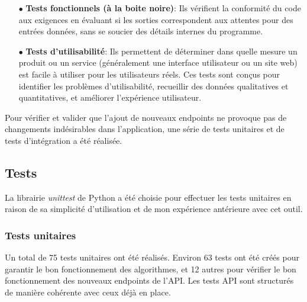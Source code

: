 \documentclass[11pt]{article}
\begin{document}
\begin{itemize}
	\item[$\bullet$] \textbf{Tests fonctionnels (à la boite noire)}: Ils vérifient la conformité du code aux exigences en évaluant si les sorties correspondent aux attentes pour des entrées données, sans se soucier des détails internes du programme.\\
	
	\item[$\bullet$] \textbf{Tests d'utilisabilité}: Ils permettent de déterminer dans quelle mesure un produit ou un service (généralement une interface utilisateur ou un site web) est facile à utiliser pour les utilisateurs réels. Ces tests sont conçus pour identifier les problèmes d'utilisabilité, recueillir des données qualitatives et quantitatives, et améliorer l'expérience utilisateur.\\
\end{itemize}

Pour vérifier et valider que l'ajout de nouveaux endpoints ne provoque pas de changements indésirables dans l'application, une série de tests unitaires et de tests d'intégration a été réalisée.

\subsection{Tests}
La librairie \textit{unittest} de Python a été choisie pour effectuer les tests unitaires en raison de sa simplicité d'utilisation et de mon expérience antérieure avec cet outil.

\subsubsection{Tests unitaires}
Un total de 75 tests unitaires ont été réalisés. Environ 63 tests ont été créés pour garantir le bon fonctionnement des algorithmes, et 12 autres pour vérifier le bon fonctionnement des nouveaux endpoints de l'API. Les tests API sont structurés de manière cohérente avec ceux déjà en place.\\
\end{document}
